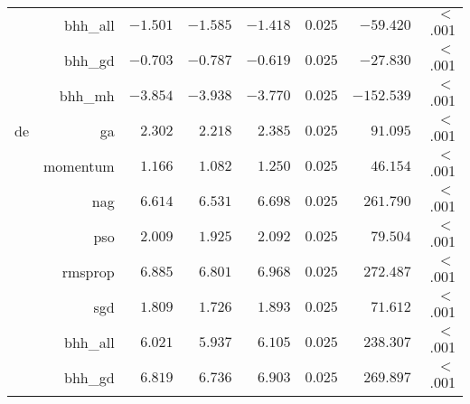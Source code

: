 \begin{table}[htb]
{\begin{tabular}{lrrrrrrr}
			                     & bhh\_all             & $-1.501$             & $-1.585$                                        & $-1.418$             & $0.025$              & $-59.420$            & $<$ .001    \\
			                     & bhh\_gd              & $-0.703$             & $-0.787$                                        & $-0.619$             & $0.025$              & $-27.830$            & $<$ .001    \\
			                     & bhh\_mh              & $-3.854$             & $-3.938$                                        & $-3.770$             & $0.025$              & $-152.539$           & $<$ .001    \\
			de                   & ga                   & $2.302$              & $2.218$                                         & $2.385$              & $0.025$              & $91.095$             & $<$ .001    \\
			$ $                  & momentum             & $1.166$              & $1.082$                                         & $1.250$              & $0.025$              & $46.154$             & $<$ .001    \\
			                     & nag                  & $6.614$              & $6.531$                                         & $6.698$              & $0.025$              & $261.790$            & $<$ .001    \\
			                     & pso                  & $2.009$              & $1.925$                                         & $2.092$              & $0.025$              & $79.504$             & $<$ .001    \\
			                     & rmsprop              & $6.885$              & $6.801$                                         & $6.968$              & $0.025$              & $272.487$            & $<$ .001    \\
			                     & sgd                  & $1.809$              & $1.726$                                         & $1.893$              & $0.025$              & $71.612$             & $<$ .001    \\
			                     & bhh\_all             & $6.021$              & $5.937$                                         & $6.105$              & $0.025$              & $238.307$            & $<$ .001    \\
			                     & bhh\_gd              & $6.819$              & $6.736$                                         & $6.903$              & $0.025$              & $269.897$            & $<$ .001    \\

\end{tabular}}
\end{table}
